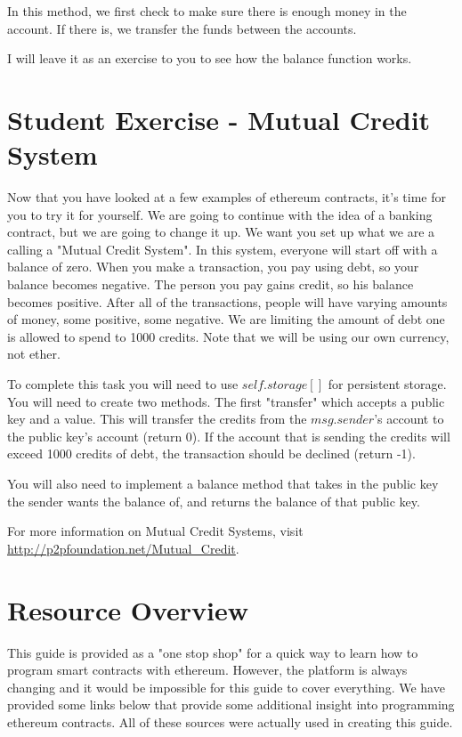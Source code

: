 \documentclass[12pt]{article}
\begin{document}
In this method, we first check to make sure there is enough money in the account. If there is, we transfer the funds between the accounts. 

I will leave it as an exercise to you to see how the balance function works.  

\section{Student Exercise - Mutual Credit System}
Now that you have looked at a few examples of ethereum contracts, it's time for you to try it for yourself. We are going to continue with the idea of a banking contract, but we are going to change it up. We want you set up what we are a calling a "Mutual Credit System". In this system, everyone will start off with a balance of zero. When you make a transaction, you pay using debt, so your balance becomes negative. The person you pay gains credit, so his balance becomes positive. After all of the transactions, people will have varying amounts of money, some positive, some negative. We are limiting the amount of debt one is allowed to spend to 1000 credits. Note that we will be using our own currency, not ether.

To complete this task you will need to use $self.storage[]$ for persistent storage. You will need to create two methods. The first "transfer" which accepts a public key and a value. This will transfer the credits from the $msg.sender$'s account to the public key's account (return 0). If the account that is sending the credits will exceed 1000 credits of debt, the transaction should be declined (return -1). 

You will also need to implement a balance method that takes in the public key the sender wants the balance of, and returns the balance of that public key.

For more information on Mutual Credit Systems, visit \url{http://p2pfoundation.net/Mutual_Credit}.



\section{Resource Overview}

This guide is provided as a "one stop shop" for a quick way to learn how to program smart contracts with ethereum. However, the platform is always changing and it would be impossible for this guide to cover everything. We have provided some links below that provide some additional insight into programming ethereum contracts. All of these sources were actually used in creating this guide. 
\end{document}
